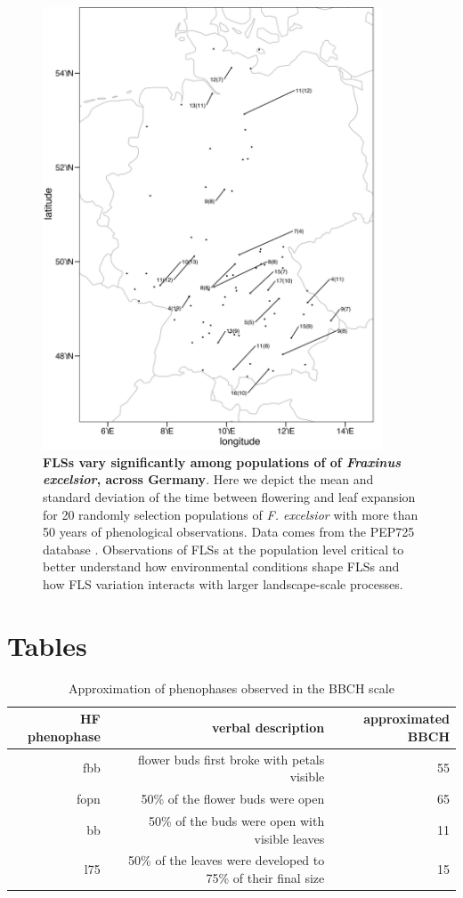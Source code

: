 \documentclass[11pt]{article}
\begin{document}
\begin{figure}[H]
\centering
\includegraphics[width=0.9\textwidth]{..//..//popmap.png} 
  \caption{\textbf{FLSs vary significantly among populations of of \emph{Fraxinus excelsior}, across Germany}. Here we depict the mean and standard deviation of the time between flowering and leaf expansion for 20 randomly selection populations of \emph{F. excelsior} with more than 50 years of phenological observations. Data comes from the PEP725 database \citep{PEP725}. Observations of FLSs at the population level critical to better understand how environmental conditions shape FLSs and how FLS variation interacts with larger landscape-scale processes.}
  \label{fig:popmap}
    \end{figure}

\section*{Tables}

\begin{table}[H]
\centering
\begin{tabular}{rrr}
  \hline
  HF phenophase & verbal description & approximated BBCH  \\ 
  \hline
  fbb & flower buds first broke with petals visible & 55 \\
  fopn &  50\% of the flower buds were open & 65 \\
 bb &  50\% of the buds were open with visible leaves & 11 \\
 l75 & 50\% of the leaves were developed to 75\% of their final size &  15 \\
   \hline
\end{tabular}
\caption{Approximation of phenophases observed in \citep{OKeefe2015} the BBCH scale \citep{Finn2007}} 
\label{tab:BBCH2HF}
\end{table}
\end{document}
